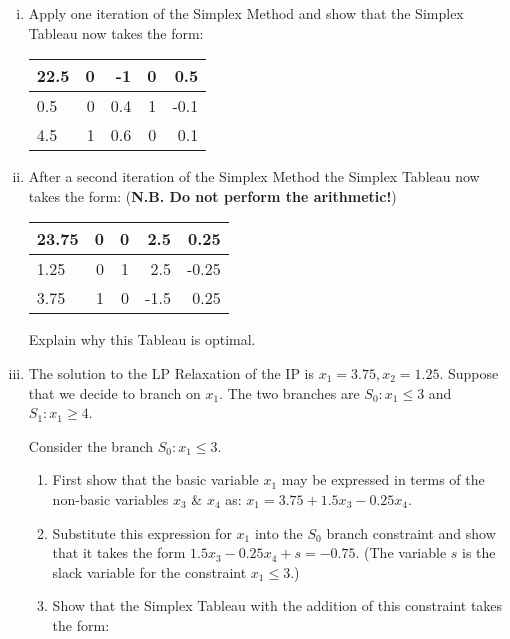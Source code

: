 \documentclass[12pt]{article}
\begin{document}
\begin{itemize}
			\begin{enumerate}[(i)]
				\item Apply one iteration of the Simplex Method and show that the  Simplex Tableau now takes the form:
				\begin{center}
				\begin{tabular}[h]{|l|rrrr|}\hline
					22.5&0&-1&0&0.5\\\hline
					0.5&0&0.4&1&-0.1\\
					4.5&1&0.6&0&0.1\\\hline
				\end{tabular}
				\end{center}
				\item After a second iteration of  the Simplex Method the  Simplex Tableau now takes the form: ({\bf N.B. Do not perform the arithmetic!})
				\begin{center}
				\begin{tabular}[h]{|l|rrrr|}\hline
					23.75     &        0            & 0&          2.5&          0.25\\\hline
					1.25&             0&          1&          2.5&         -0.25\\
					3.75&          1&             0&         -1.5&          0.25\\\hline
				\end{tabular}
				\end{center}
				Explain why this Tableau is optimal.
				\item The solution to the LP Relaxation of the IP is $x_1=3.75, x_2=1.25$. 		
				Suppose that we decide to branch on $x_1$. The two branches are $S_0: x_1 \le 3$ and $S_1: x_1 \ge 4$.

			\medskip Consider the branch  $S_0: x_1 \le 3$.
				\begin{enumerate}
					\item First show that the basic variable $x_1$ may be expressed in terms of the non-basic variables $x_3$ \& $x_4$ as: $x_1 =3.75+1.5 x_3 -0.25 x_4$.
					\item Substitute this expression for $x_1$ into the $S_0$ branch constraint and show that it takes the form $1.5 x_3-0.25 x_4 +s=-0.75$. (The variable $s$ is the slack variable for the constraint $x_1 \le 3$.)
					\item Show that the  Simplex Tableau with the addition of this constraint takes the form:
					\vspace{10pt}
					

\end{enumerate}
\end{enumerate}
\end{itemize}
\end{document}
